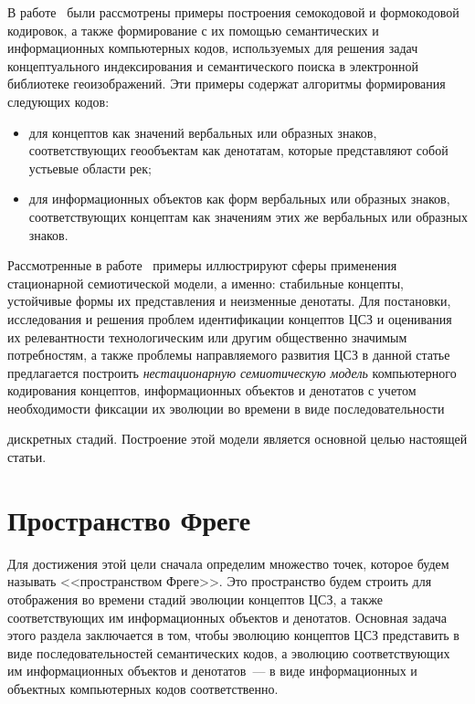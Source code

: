 \begin{multicols}{2}
   В работе~\cite{2zat} были рассмотрены примеры построения семокодовой и 
формокодовой кодировок, а также формирование с их помощью семантических и 
информационных компьютерных кодов, используемых для решения задач концептуального 
индексирования и семантического поиска в электронной библиотеке геоизображений. Эти 
примеры содержат алгоритмы формирования следующих кодов:
   \begin{itemize}
\item для концептов как значений вербальных или образных знаков, 
соответствующих геообъектам как денотатам, которые представляют собой 
устьевые области рек;
\item для информационных объектов как форм вербальных или образных знаков, 
со\-от\-вет\-ст\-ву\-ющих концептам как значениям этих же вербальных или образных 
знаков.
\end{itemize}
   
   Рассмотренные в работе~\cite{2zat} примеры иллюстрируют сферы применения 
стационарной семиотической модели, а именно: стабильные концепты, устойчивые формы 
их представления и неизменные денотаты. Для постановки, исследования и решения 
проблем идентификации концептов ЦСЗ и оценивания их релевантности технологическим 
или другим общественно значимым потребностям, а также проблемы направляемого 
развития ЦСЗ в данной статье предлагается построить \textit{нестационарную 
семиотическую модель} компьютерного кодирования концептов, информационных объектов 
и денотатов с учетом необходимости фиксации их эволюции во времени в виде 
последовательности\linebreak \vspace*{-12pt}
\columnbreak

\noindent
 дискретных стадий. Построение этой модели является основной целью 
настоящей статьи.

\section{Пространство Фреге}

   Для достижения этой цели сначала определим множество точек, которое будем называть 
<<пространством Фреге>>. Это пространство будем строить для отображения во времени 
стадий эволюции концептов ЦСЗ, а также соответствующих им информационных объектов и 
денотатов. Основная задача этого раздела заключается в том, чтобы эволюцию концептов 
ЦСЗ представить в виде последовательностей семантических кодов, а эволюцию 
соответствующих им информационных объектов и денотатов~--- в виде информационных и 
объектных компьютерных кодов соответственно.
   

\end{multicols}
